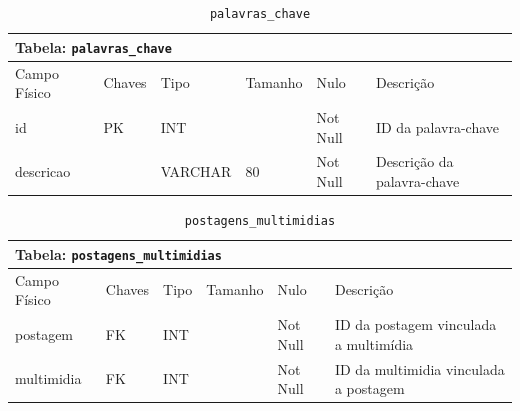 \documentclass[12pt,a4paper]{article}
\begin{document}
\begin{center}
\begin{table}[h!]
	\caption{\texttt{palavras\_chave}}
	\label{tabela:palavrasChave}
	\begin{tabular}{|p{2.3cm}|p{1.2cm}|p{1.8cm}|p{1.5cm}|p{1cm}|p{6cm}|}\hline		
		\multicolumn{6}{|p{16cm}|}{\cellcolor{cinzaClaro}  \centering Tabela: \texttt{palavras\_chave}} \\ \hline %
		{\small Campo Físico}   & {\small Chaves} & {\small Tipo} & {\small Tamanho} & {\small Nulo} & {\small Descrição}\\\hline %
		
		{\tiny id} & {\tiny PK} & {\tiny INT} & {\tiny } & {\tiny Not Null} &{\tiny ID da palavra-chave}\\\hline
		{\tiny descricao} & {\tiny } & {\tiny VARCHAR} & {\tiny 80} & {\tiny Not Null} &{\tiny Descrição da palavra-chave}\\\hline
			
	\end{tabular}
\end{table}	
\end{center}

\begin{center}
\begin{table}[h!]
	\caption{\texttt{postagens\_multimidias}}
	\label{tabela:postagensMultimidias}
	\begin{tabular}{|p{2.3cm}|p{1.2cm}|p{1.8cm}|p{1.5cm}|p{1cm}|p{6cm}|}\hline		
		\multicolumn{6}{|p{16cm}|}{\cellcolor{cinzaClaro}  \centering Tabela: \texttt{postagens\_multimidias}} \\ \hline %
		{\small Campo Físico}   & {\small Chaves} & {\small Tipo} & {\small Tamanho} & {\small Nulo} & {\small Descrição}\\\hline %
		
		{\tiny postagem} & {\tiny FK} & {\tiny INT} & {\tiny } & {\tiny Not Null} &{\tiny ID da postagem vinculada a multimídia}\\\hline
		{\tiny multimidia} & {\tiny FK} & {\tiny INT} & {\tiny } & {\tiny Not Null} &{\tiny ID da multimidia vinculada a postagem}\\\hline
	
			
	\end{tabular}
\end{table}	
\end{center}
\end{document}
